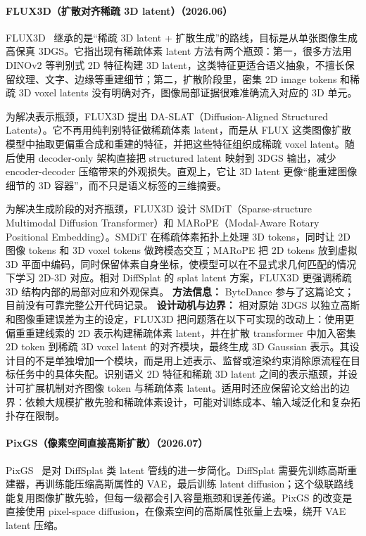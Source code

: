 \paragraph{FLUX3D（扩散对齐稀疏 3D latent）（2026.06）}
FLUX3D~\cite{2606_24874} 继承的是“稀疏 3D latent + 扩散生成”的路线，目标是从单张图像生成高保真 3DGS。它指出现有稀疏体素 latent 方法有两个瓶颈：第一，很多方法用 DINOv2 等判别式 2D 特征构建 3D latent，这类特征更适合语义抽象，不擅长保留纹理、文字、边缘等重建细节；第二，扩散阶段里，密集 2D image tokens 和稀疏 3D voxel latents 没有明确对齐，图像局部证据很难准确流入对应的 3D 单元。

为解决表示瓶颈，FLUX3D 提出 DA-SLAT（Diffusion-Aligned Structured Latents）。它不再用纯判别特征做稀疏体素 latent，而是从 FLUX 这类图像扩散模型中抽取更偏重合成和重建的特征，并把这些特征组织成稀疏 voxel latent。随后使用 decoder-only 架构直接把 structured latent 映射到 3DGS 输出，减少 encoder-decoder 压缩带来的外观损失。直观上，它让 3D latent 更像“能重建图像细节的 3D 容器”，而不只是语义标签的三维摘要。

为解决生成阶段的对齐瓶颈，FLUX3D 设计 SMDiT（Sparse-structure Multimodal Diffusion Transformer）和 MARoPE（Modal-Aware Rotary Positional Embedding）。SMDiT 在稀疏体素拓扑上处理 3D tokens，同时让 2D 图像 tokens 和 3D voxel tokens 做跨模态交互；MARoPE 把 2D tokens 放到虚拟 3D 平面中编码，同时保留体素自身坐标，使模型可以在不显式求几何匹配的情况下学习 2D-3D 对应。相对 DiffSplat 的 splat latent 方案，FLUX3D 更强调稀疏 3D 结构内部的局部对应和外观保真。
\textbf{方法信息：} ByteDance 参与了这篇论文；目前没有可靠完整公开代码记录。
\textbf{设计动机与边界：} 相对原始 3DGS 以独立高斯和图像重建误差为主的设定，FLUX3D 把问题落在以下可实现的改动上：使用更偏重重建线索的 2D 表示构建稀疏体素 latent，并在扩散 transformer 中加入密集 2D token 到稀疏 3D voxel latent 的对齐模块，最终生成 3D Gaussian 表示。其设计目的不是单独增加一个模块，而是用上述表示、监督或渲染约束消除原流程在目标任务中的具体失配。识别语义 2D 特征和稀疏 3D latent 之间的表示瓶颈，并设计可扩展机制对齐图像 token 与稀疏体素 latent。适用时还应保留论文给出的边界：依赖大规模扩散先验和稀疏体素设计，可能对训练成本、输入域泛化和复杂拓扑存在限制。
\paragraph{PixGS（像素空间直接高斯扩散）（2026.07）}
PixGS~\cite{2607_01803} 是对 DiffSplat 类 latent 管线的进一步简化。DiffSplat 需要先训练高斯重建器，再训练能压缩高斯属性的 VAE，最后训练 latent diffusion；这个级联路线能复用图像扩散先验，但每一级都会引入容量瓶颈和误差传递。PixGS 的改变是直接使用 pixel-space diffusion，在像素空间的高斯属性张量上去噪，绕开 VAE latent 压缩。

